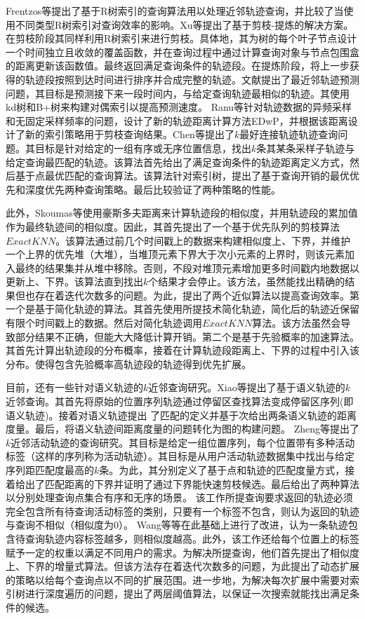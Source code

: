 Frentzos等\cite{FrentzosGPT07}提出了基于R树索引的查询算法用以处理近邻轨迹查询，并比较了当使用不同类型R树索引对查询效率的影响。Xu等\cite{GutingBX10}提出了基于剪枝-提炼的解决方案。在剪枝阶段其同样利用R树索引来进行剪枝。具体地，其为树的每个叶子节点设计一个时间独立且收敛的覆盖函数，并在查询过程中通过计算查询对象与节点包围盒的距离更新该函数值。最终返回满足查询条件的轨迹段。在提炼阶段，将上一步获得的轨迹段按照到达时间进行排序并合成完整的轨迹。文献\cite{KolliosGT99}提出了最近邻轨迹预测问题，其目标是预测接下来一段时间内，与给定查询轨迹最相似的轨迹。其使用kd树和B+树来构建对偶索引以提高预测速度。
Ranu等针对轨迹数据的异频采样和无固定采样频率的问题，设计了新的轨迹距离计算方法EDwP，并根据该距离设计了新的索引策略用于剪枝查询结果。Chen等\cite{ChenSZZX10}提出了$k$最好连接轨迹轨迹查询问题。其目标是针对给定的一组有序或无序位置信息，找出$k$条其某条采样子轨迹与给定查询最匹配的轨迹。该算法首先给出了满足查询条件的轨迹距离定义方式，然后基于点最优匹配的查询算法。该算法针对索引树，提出了基于查询开销的最优优先和深度优先两种查询策略。最后比较验证了两种策略的性能。

此外，Skoumas等\cite{Skoumas}使用豪斯多夫距离来计算轨迹段的相似度，并用轨迹段的累加值作为最终轨迹间的相似度。因此，其首先提出了一个基于优先队列的剪枝算法$ExactKNN$。该算法通过前几个时间戳上的数据来构建相似度上、下界，并维护一个上界的优先堆（大堆），当堆顶元素下界大于次小元素的上界时，则该元素加入最终的结果集并从堆中移除。否则，不段对堆顶元素增加更多时间戳内地数据以更新上、下界。该算法直到找出$k$个结果才会停止。该方法，虽然能找出精确的结果但也存在着迭代次数多的问题。为此，提出了两个近似算法以提高查询效率。第一个是基于简化轨迹的算法。其首先使用\cite{Zhao1997LINEAR}所提技术简化轨迹，简化后的轨迹近保留有限个时间戳上的数据。然后对简化轨迹调用$ExactKNN$算法。该方法虽然会导致部分结果不正确，但能大大降低计算开销。第二个是基于先验概率的加速算法。其首先计算出轨迹段的分布概率，接着在计算轨迹段距离上、下界的过程中引入该分布。使得包含先验概率高轨迹段的轨迹得到优先扩展。


目前，还有一些针对语义轨迹的$k$近邻查询研究\cite{Xiao,Kaiser,WangBCSSQ17}。Xiao等\cite{Xiao}提出了基于语义轨迹的$k$近邻查询。其首先将原始的位置序列轨迹通过停留区查找算法变成停留区序列(即语义轨迹)。接着对语义轨迹提出 了匹配的定义并基于次给出两条语义轨迹的距离度量。最后，将语义轨迹间距离度量的问题转化为图的构建问题。
Zheng等\cite{Kaiser}提出了$k$近邻活动轨迹的查询研究。其目标是给定一组位置序列，每个位置带有多种活动标签（这样的序列称为活动轨迹）。其目标是从用户活动轨迹数据集中找出与给定序列距匹配度最高的$k$条。为此，其分别定义了基于点和轨迹的匹配度量方式，接着给出了匹配距离的下界并证明了通过下界能快速剪枝候选。最后给出了两种算法以分别处理查询点集合有序和无序的场景。
该工作所提查询要求返回的轨迹必须完全包含所有待查询活动标签的类别，只要有一个标签不包含，则认为返回的轨迹与查询不相似（相似度为0）。
Wang等\cite{WangBCSSQ17}等在此基础上进行了改进，认为一条轨迹包含待查询轨迹内容标签越多，则相似度越高。此外，该工作还给每个位置上的标签赋予一定的权重以满足不同用户的需求。为解决所提查询，他们首先提出了相似度上、下界的增量式算法。但该方法存在着迭代次数多的问题，为此提出了动态扩展的策略以给每个查询点以不同的扩展范围。进一步地，为解决每次扩展中需要对索引树进行深度遍历的问题，提出了两层阈值算法，以保证一次搜索就能找出满足条件的候选。

